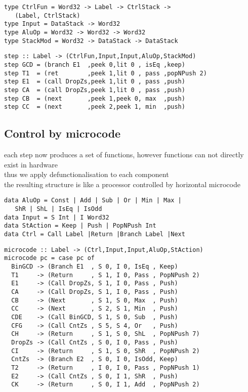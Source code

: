 \documentclass[preprint]{sigplanconf}
\def\codefamily{\sffamily\normalsize}
\def\codesmall{\sffamily\small}
\begin{document}
\begin{lstlisting}
type CtrlFun = Word32 -> Label -> CtrlStack ->
   (Label, CtrlStack)
type Input = DataStack -> Word32
type AluOp = Word32 -> Word32 -> Word32
type StackMod = Word32 -> DataStack -> DataStack
\end{lstlisting}

\lstset{basicstyle=\codesmall}
\begin{lstlisting}
step :: Label -> (CtrlFun,Input,Input,AluOp,StackMod)
step GCD = (branch E1  ,peek 0,lit 0 , isEq ,keep)
step T1  = (ret        ,peek 1,lit 0 , pass ,popNPush 2)
step E1  = (call DropZs,peek 1,lit 0 , pass ,push)
step CA  = (call DropZs,peek 1,lit 0 , pass ,push)
step CB  = (next       ,peek 1,peek 0, max  ,push)
step CC  = (next       ,peek 2,peek 1, min  ,push)
\end{lstlisting}
\lstset{basicstyle=\codefamily}

\subsection{Control by microcode}

each step now produces a set of functions, however functions can not directly exist in hardware \\
thus we apply defunctionalisation to each component \\
the resulting structure is like a processor controlled by horizontal microcode

\begin{lstlisting}
data AluOp = Const | Add | Sub | Or | Min | Max |
   ShR | ShL | IsEq | IsOdd
data Input = S Int | I Word32
data StAction = Keep | Push | PopNPush Int
data Ctrl = Call Label |Return |Branch Label |Next
\end{lstlisting}

\lstset{basicstyle=\codesmall}
\begin{lstlisting}
microcode :: Label -> (Ctrl,Input,Input,AluOp,StAction)
microcode pc = case pc of
  BinGCD -> (Branch E1  , S 0, I 0, IsEq , Keep)
  T1     -> (Return     , S 1, I 0, Pass , PopNPush 2)
  E1     -> (Call DropZs, S 1, I 0, Pass , Push)
  CA     -> (Call DropZs, S 1, I 0, Pass , Push)
  CB     -> (Next       , S 1, S 0, Max  , Push)
  CC     -> (Next       , S 2, S 1, Min  , Push)
  CDE    -> (Call BinGCD, S 1, S 0, Sub  , Push)
  CFG    -> (Call CntZs , S 5, S 4, Or   , Push)
  CH     -> (Return     , S 1, S 0, ShL  , PopNPush 7)
  DropZs -> (Call CntZs , S 0, I 0, Pass , Push)
  CI     -> (Return     , S 1, S 0, ShR  , PopNPush 2)
  CntZs  -> (Branch E2  , S 0, I 0, IsOdd, Keep)
  T2     -> (Return     , I 0, I 0, Pass , PopNPush 1)
  E2     -> (Call CntZs , S 0, I 1, ShR  , Push)
  CK     -> (Return     , S 0, I 1, Add  , PopNPush 2)
\end{lstlisting}
\lstset{basicstyle=\codefamily}
\end{document}
